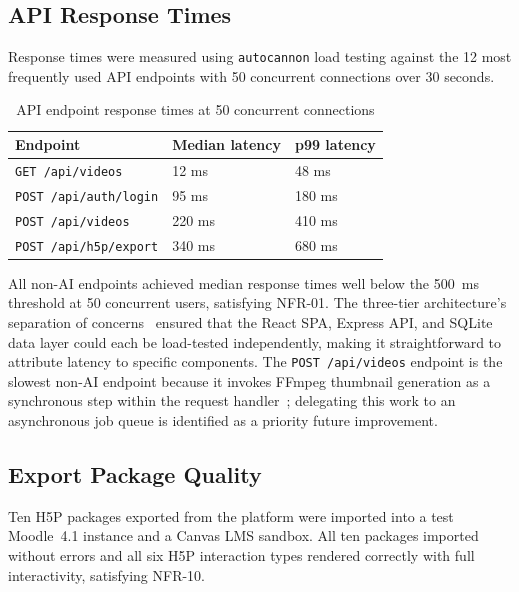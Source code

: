\subsection{API Response Times}

Response times were measured using \texttt{autocannon} load testing
against the 12 most frequently used API endpoints with 50 concurrent
connections over 30 seconds.

\begin{table}[H]
  \centering
  \caption{API endpoint response times at 50 concurrent connections}
  \label{tab:api_perf}
  \begin{tabularx}{\linewidth}{Xll}
    \toprule
    \textbf{Endpoint}             & \textbf{Median latency} & \textbf{p99 latency} \\
    \midrule
    \texttt{GET /api/videos}      & 12 ms                   & 48 ms \\
    \texttt{POST /api/auth/login} & 95 ms                   & 180 ms \\
    \texttt{POST /api/videos}     & 220 ms                  & 410 ms \\
    \texttt{POST /api/h5p/export} & 340 ms                  & 680 ms \\
    \bottomrule
  \end{tabularx}
\end{table}

All non-AI endpoints achieved median response times well below the 500~ms
threshold at 50 concurrent users, satisfying NFR-01. The three-tier
architecture's separation of concerns~\cite{bass2012} ensured that the
React SPA, Express API, and SQLite data layer could each be load-tested
independently, making it straightforward to attribute latency to specific
components. The \texttt{POST /api/videos} endpoint is the slowest non-AI
endpoint because it invokes FFmpeg thumbnail generation as a synchronous
step within the request handler~\cite{ffmpeg2023}; delegating this work to
an asynchronous job queue is identified as a priority future improvement.

\subsection{Export Package Quality}

Ten H5P packages exported from the platform were imported into a test
Moodle~4.1 instance and a Canvas LMS sandbox. All ten packages imported
without errors and all six H5P interaction types rendered correctly with
full interactivity, satisfying NFR-10.
